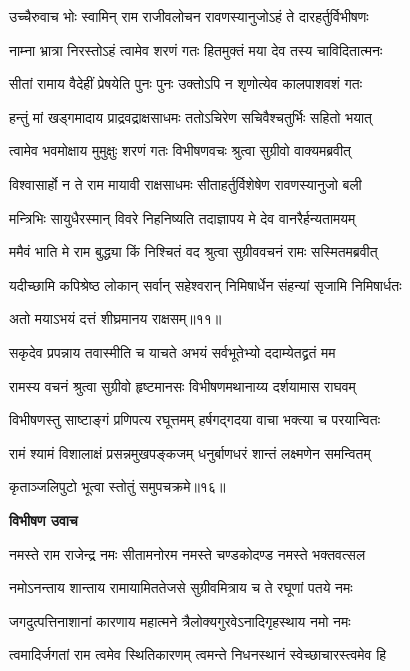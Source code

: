 \twolineshloka
{उच्चैरुवाच भोः स्वामिन् राम राजीवलोचन}
{रावणस्यानुजोऽहं ते दारहर्तुर्विभीषणः} %

\twolineshloka
{नाम्ना भ्रात्रा निरस्तोऽहं त्वामेव शरणं गतः}
{हितमुक्तं मया देव तस्य चाविदितात्मनः} %

\twolineshloka
{सीतां रामाय वैदेहीं प्रेषयेति पुनः पुनः}
{उक्तोऽपि न शृणोत्येव कालपाशवशं गतः} %

\twolineshloka
{हन्तुं मां खड्गमादाय प्राद्रवद्राक्षसाधमः}
{ततोऽचिरेण सचिवैश्चतुर्भिः सहितो भयात्} %

\twolineshloka
{त्वामेव भवमोक्षाय मुमुक्षुः शरणं गतः}
{विभीषणवचः श्रुत्वा सुग्रीवो वाक्यमब्रवीत्} %

\twolineshloka
{विश्वासार्हो न ते राम मायावी राक्षसाधमः}
{सीताहर्तुर्विशेषेण रावणस्यानुजो बली} %

\twolineshloka
{मन्त्रिभिः सायुधैरस्मान् विवरे निहनिष्यति}
{तदाज्ञापय मे देव वानरैर्हन्यतामयम्} %

\twolineshloka
{ममैवं भाति मे राम बुद्ध्या किं निश्चितं वद}
{श्रुत्वा सुग्रीववचनं रामः सस्मितमब्रवीत्} %

\twolineshloka
{यदीच्छामि कपिश्रेष्ठ लोकान् सर्वान् सहेश्वरान्}
{निमिषार्धेन संहन्यां सृजामि निमिषार्धतः} %

{अतो मयाऽभयं दत्तं शीघ्रमानय राक्षसम्॥११॥} %


\twolineshloka
{सकृदेव प्रपन्नाय तवास्मीति च याचते}
{अभयं सर्वभूतेभ्यो ददाम्येतद्व्रतं मम} %

\twolineshloka
{रामस्य वचनं श्रुत्वा सुग्रीवो हृष्टमानसः}
{विभीषणमथानाय्य दर्शयामास राघवम्} %

\twolineshloka
{विभीषणस्तु साष्टाङ्गं प्रणिपत्य रघूत्तमम्}
{हर्षगद्गदया वाचा भक्त्या च परयान्वितः} %

\twolineshloka
{रामं श्यामं विशालाक्षं प्रसन्नमुखपङ्कजम्}
{धनुर्बाणधरं शान्तं लक्ष्मणेन समन्वितम्} %

{कृताञ्जलिपुटो भूत्वा स्तोतुं समुपचक्रमे॥१६॥} %


\textbf{विभीषण उवाच}

\twolineshloka
{नमस्ते राम राजेन्द्र नमः सीतामनोरम}
{नमस्ते चण्डकोदण्ड नमस्ते भक्तवत्सल} %

\twolineshloka
{नमोऽनन्ताय शान्ताय रामायामिततेजसे}
{सुग्रीवमित्राय च ते रघूणां पतये नमः} %

\twolineshloka
{जगदुत्पत्तिनाशानां कारणाय महात्मने}
{त्रैलोक्यगुरवेऽनादिगृहस्थाय नमो नमः} %

\twolineshloka
{त्वमादिर्जगतां राम त्वमेव स्थितिकारणम्}
{त्वमन्ते निधनस्थानं स्वेच्छाचारस्त्वमेव हि} %


